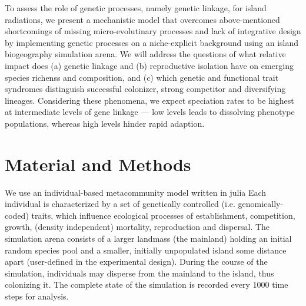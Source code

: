 \documentclass[a4paper]{scrartcl}
\begin{document}


To assess the role of genetic processes, namely genetic linkage, for island radiations,
we present a mechanistic model that overcomes above-mentioned shortcomings of missing micro-evolutinary processes and lack of integrative design %
by implementing genetic processes on a niche-explicit background
using an island biogeography simulation arena.%
We will address the questions of what relative impact does (a) genetic linkage and
(b) reproductive isolation have on emerging species richenss and composition,
and (c) which genetic and functional trait syndromes %
distinguish successful colonizer,
strong competitor and diversifying lineages.
Considering these phenomena, we expect speciation rates to be highest at intermediate levels of gene linkage --- low
levels leads to dissolving phenotype populations, whereas high levels hinder rapid adaption. %


\section{Material and Methods}
We use an individual-based metacommunity model written in julia %
Each individual is characterized by a set of genetically controlled (i.e. genomically-coded) traits,
which influence ecological processes of
establishment, competition, growth, (density independent) mortality, reproduction and dispersal.
The simulation arena consists of a larger landmass (the mainland) holding an initial random species pool and a smaller,
initially unpopulated island some distance apart (user-defined in the experimental design).
During the course of the simulation, individuals may disperse from the mainland to the island, thus colonizing it. 
The complete state of the simulation is recorded every 1000 time steps for analysis.
\end{document}
